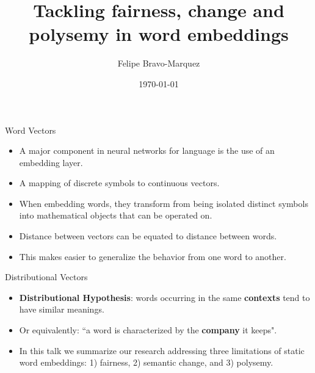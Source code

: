 \documentclass[handout]{beamer}
\title{Tackling fairness, change and polysemy in word embeddings}
\author[Felipe Bravo Márquez]{\footnotesize
 \textcolor[rgb]{0.00,0.00,1.00}{Felipe Bravo-Marquez}}
\institute{Department of Computer Science, University of Chile \\ Millenium Institute Foundational Research on Data }
\date{\today}
\begin{document}
\begin{frame}
\titlepage


\end{frame}


\begin{frame}{Word Vectors}
\begin{scriptsize}
\begin{itemize}
\item A major component in neural networks for language is the use of an embedding
layer.
\item A mapping of discrete symbols to continuous vectors.
\item  When embedding words, they transform from being isolated distinct symbols into mathematical
objects that can be operated on.
\item Distance between vectors can be equated to distance between words.
\item This makes easier to generalize the behavior from one word to another.
\end{itemize}
\end{scriptsize}
\end{frame}


\begin{frame}{Distributional Vectors}
\begin{scriptsize}
\begin{itemize}
\item \textbf{Distributional Hypothesis}: words occurring in the same \textbf{contexts} tend to have similar meanings.
\item Or equivalently: ``a word is characterized by the \textbf{company} it keeps".
\item In this talk we summarize our research addressing three limitations of static word embeddings: 1) fairness, 2) semantic change, and 3) polysemy.

\end{itemize}
\end{scriptsize}
\end{frame}
\end{document}
